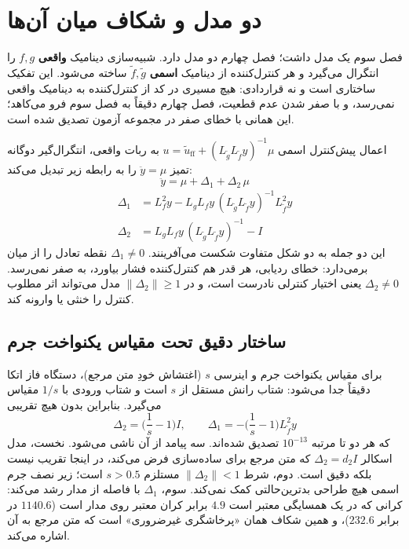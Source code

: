 \documentclass[10pt,twocolumn]{article}
\newcommand{\en}[1]{\lr{#1}}
\begin{document}
\section{دو مدل و شکاف میان آن‌ها}
فصل سوم یک مدل داشت؛ فصل چهارم دو مدل دارد. شبیه‌سازی دینامیک \textbf{واقعی}
$f,g$ را انتگرال می‌گیرد و هر کنترل‌کننده از دینامیک \textbf{اسمی}
$\tilde f,\tilde g$ ساخته می‌شود. این تفکیک ساختاری است و نه قراردادی: هیچ
مسیری در کد از کنترل‌کننده به دینامیک واقعی نمی‌رسد، و با صفر شدن عدم قطعیت،
فصل چهارم دقیقاً به فصل سوم فرو می‌کاهد؛ این همانی با خطای صفر در مجموعه آزمون
تصدیق شده است.

اعمال پیش‌کنترل اسمی
$u=\tilde u_{\mathrm{ff}}+(L_{\tilde g}L_{\tilde f}y)^{-1}\mu$ به ربات واقعی،
انتگرال‌گیر دوگانه تمیز $\ddot y=\mu$ را به رابطه زیر تبدیل می‌کند:
\begin{equation}
    \ddot y = \mu + \Delta_1 + \Delta_2\,\mu
    \label{eq:unc}
\end{equation}
\begin{align}
    \Delta_1 &= L_f^2 y - L_gL_f y\,(L_{\tilde g}L_{\tilde f}y)^{-1}L_{\tilde f}^2 y \nonumber\\
    \Delta_2 &= L_gL_f y\,(L_{\tilde g}L_{\tilde f}y)^{-1} - I
    \label{eq:deltas}
\end{align}
این دو جمله به دو شکل متفاوت شکست می‌آفرینند. $\Delta_1\neq0$ نقطه تعادل را از
میان برمی‌دارد: خطای ردیابی، هر قدر هم کنترل‌کننده فشار بیاورد، به صفر نمی‌رسد.
$\Delta_2\neq0$ یعنی اختیار کنترلی نادرست است، و در $\|\Delta_2\|\ge1$ مدل می‌تواند
اثر مطلوب کنترل را خنثی یا وارونه کند.

\subsection{ساختار دقیق تحت مقیاس یکنواخت جرم}
برای مقیاس یکنواخت جرم و اینرسی $s$ (اغتشاش خودِ متن مرجع)، دستگاه \en{KKT} فاز
اتکا دقیقاً جدا می‌شود: شتاب رانش مستقل از $s$ است و شتاب ورودی با $1/s$ مقیاس
می‌گیرد. بنابراین بدون هیچ تقریبی
\begin{equation}
    \Delta_2 = \Big(\frac{1}{s}-1\Big) I,\qquad
    \Delta_1 = -\Big(\frac{1}{s}-1\Big) L_{\tilde f}^2 y
    \label{eq:scale}
\end{equation}
که هر دو تا مرتبه $10^{-13}$ تصدیق شده‌اند. سه پیامد از آن ناشی می‌شود. نخست،
مدل اسکالر $\Delta_2=d_2I$ که متن مرجع برای ساده‌سازی فرض می‌کند، در اینجا تقریب
نیست بلکه دقیق است. دوم، شرط $\|\Delta_2\|<1$ مستلزم $s>0.5$ است؛ زیر نصف جرم
اسمی هیچ طراحی بدترین‌حالتی کمک نمی‌کند. سوم، $\Delta_1$ با فاصله از مدار رشد
می‌کند: کرانی که در یک همسایگی معتبر است $4.9$ برابر کران معتبر روی مدار است
($1140.6$ در برابر $232.6$)، و همین شکاف همان «پرخاشگری غیرضروری» است که
متن مرجع به آن اشاره می‌کند.
\end{document}
